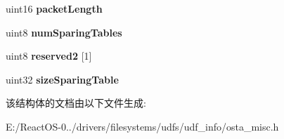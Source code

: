 \begin{DoxyCompactItemize}
\mbox{\label{struct___s_p_a_r_a_b_l_e___p_a_r_t_i_t_i_o_n___m_a_p_a31cdfacd3a332457048bcf38022669dc}} 
uint16 {\bfseries packet\+Length}
\item 
\mbox{\label{struct___s_p_a_r_a_b_l_e___p_a_r_t_i_t_i_o_n___m_a_p_a013db65ae31659b670e17e616de5d87d}} 
uint8 {\bfseries num\+Sparing\+Tables}
\item 
\mbox{\label{struct___s_p_a_r_a_b_l_e___p_a_r_t_i_t_i_o_n___m_a_p_ab43cde2a06e4c14b8c362106881bdbb5}} 
uint8 {\bfseries reserved2} \mbox{[}1\mbox{]}
\item 
\mbox{\label{struct___s_p_a_r_a_b_l_e___p_a_r_t_i_t_i_o_n___m_a_p_a2657e4cd99e990effa9c5c568c7d8025}} 
uint32 {\bfseries size\+Sparing\+Table}
\end{DoxyCompactItemize}


该结构体的文档由以下文件生成\+:\begin{DoxyCompactItemize}
\item 
E\+:/\+React\+O\+S-\/0../drivers/filesystems/udfs/udf\+\_\+info/osta\+\_\+misc.\+h\end{DoxyCompactItemize}
